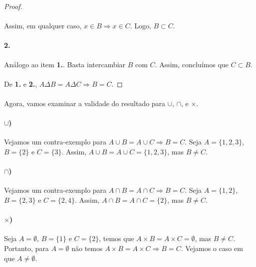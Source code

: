 \documentclass[9pt,twocolumn,a4paper]{article}
\begin{document}
\begin{proof}
    \paragraph{}
    Assim, em qualquer caso, $x \in B \Rightarrow x \in C$. Logo, $B \subset C$.

    \paragraph{2.}
    Análogo ao item \textbf{1.}. Basta intercambiar $B$ com $C$. Assim, concluímos que $C \subset B$.

    \paragraph{}
    De \textbf{1.} e \textbf{2.}, $A \Delta B = A \Delta C \Rightarrow B = C$.
    \end{proof}

    \paragraph{}
    Agora, vamos examinar a validade do resultado para $\cup$, $\cap$, e $\times$.

    \paragraph{$\cup$)}
    Vejamos um contra-exemplo para $A \cup B = A \cup C \Rightarrow B = C$. Seja $A = \{1, 2, 3\}$, $B = \{2\}$ e $C = \{3\}$. Assim, $A \cup B = A \cup C = \{1, 2, 3\}$, mas $B \not= C$.

    \paragraph{$\cap$)}
    Vejamos um contra-exemplo para $A \cap B = A \cap C \Rightarrow B = C$. Seja $A = \{1, 2\}$, $B = \{2, 3\}$ e $C = \{2, 4\}$. Assim, $A \cap B = A \cap C = \{2\}$, mas $B \not= C$.

    \paragraph{$\times$)}
    Seja $A = \emptyset$, $B = \{1\}$ e $C = \{2\}$, temos que $A \times B = A \times C = \emptyset$, mas $B \not= C$. Portanto, para $A = \emptyset$ não temos $A \times B = A \times C \Rightarrow B = C$. Vejamos o caso em que $A \not= \emptyset$.
\end{document}
